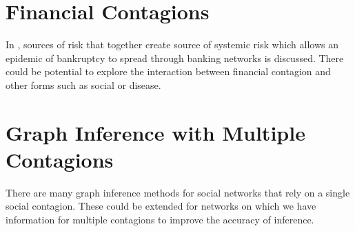\documentclass[11pt]{article}
\begin{document}
\section{Financial Contagions}

In \cite{Cacciolo}, sources of risk that together create
source of systemic risk which allows an epidemic of bankruptcy to
spread through banking networks is discussed. There could be potential
to explore the interaction between financial contagion and other
forms such as social or disease.

\section{Graph Inference with Multiple Contagions}

There are many graph inference methods for social networks that
rely on a single social contagion. These could be extended for
networks on which we have information for multiple contagions to
improve the accuracy of inference.





\end{document}
